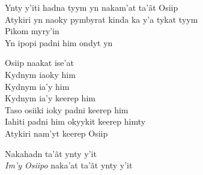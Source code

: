   \noindent Ynty y'iti hadna tyym yn nakam'at ta'ãt Osiip\\
  Atykiri yn naoky pymbyrat kinda ka y'a tykat tyym\\
  Pikom myry'in\\
  Yn ipopi padni him ondyt yn
 
 \smallskip
 \begin{center}\end{center}
 \smallskip
 
\noindent   Osiip naakat ise'at\\
  Kydnym iaoky him\\
  Kydnym ia'y him\\
  Kydnym ia'y keerep him\\
  Taso osiiki ioky padni keerep him\\
  Iahiti padni him okyykit keerep himty\\
  Atykiri nam'yt keerep Osiip
 
 \smallskip
 \begin{center}\end{center}
 \smallskip
 
\noindent   Nakahadn ta'ãt ynty y'it\\
  \textit{Im'y Osiipo} naka'at ta'ãt ynty y'it
 
 \smallskip
 \begin{center}\end{center}
 \smallskip
 
